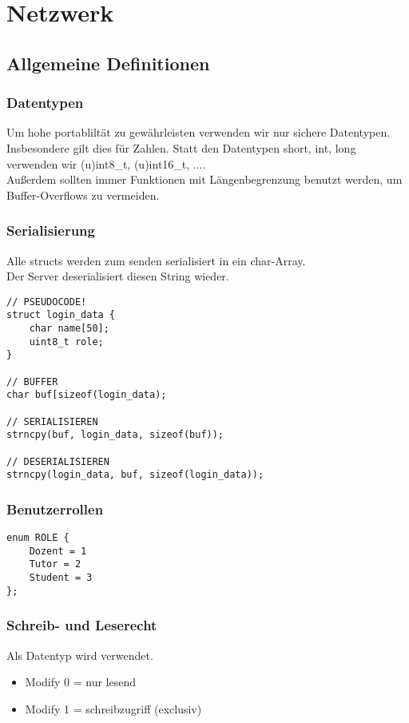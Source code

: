 \section{Netzwerk}

\subsection{Allgemeine Definitionen}
\subsubsection{Datentypen}
Um hohe portabliltät zu gewährleisten verwenden wir nur sichere Datentypen.
Insbesondere gilt dies für Zahlen. Statt den Datentypen short, int, long verwenden
wir (u)int8\_t, (u)int16\_t, ....\\
Außerdem sollten immer Funktionen mit Längenbegrenzung benutzt werden, 
um Buffer-Overflows zu vermeiden.

\subsubsection{Serialisierung}
Alle structs werden zum senden serialisiert in ein char-Array. \\
Der Server deserialisiert diesen String wieder.

\begin{lstlisting}
// PSEUDOCODE!
struct login_data {
    char name[50];
    uint8_t role;
}

// BUFFER
char buf[sizeof(login_data);

// SERIALISIEREN
strncpy(buf, login_data, sizeof(buf));

// DESERIALISIEREN
strncpy(login_data, buf, sizeof(login_data));
\end{lstlisting}

\subsubsection{Benutzerrollen}
\begin{lstlisting}
enum ROLE {
    Dozent = 1
    Tutor = 2
    Student = 3
};
\end{lstlisting}

\subsubsection{Schreib- und Leserecht}
Als Datentyp wird  verwendet.
\begin{itemize}
	\item Modify 0 = nur lesend
	\item Modify 1 = schreibzugriff (exclusiv)
\end{itemize}


